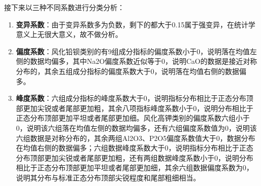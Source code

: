 \documentclass{article}
\begin{document}
	接下来以三种不同系数进行分类分析：
	
	\begin{enumerate}
		\item \textbf{变异系数}：由于变异系数多为负数，剩下的都大于0.15属于强变异，在统计学意义上无很大意义，故不做分析。
		\item \textbf{偏度系数}：风化铅钡类别的有9组成分指标的偏度系数小于0，说明落在均值左侧的数据均偏多，其中Na2O偏度系数近似等于0，说明CaO的数据是接近对称分布的，其余五组成分指标的偏度系数大于0，说明落在均值右侧的数据偏多。
		\item \textbf{峰度系数}：六组成分指标的峰度系数大于0，说明指标分布相比于正态分布顶部更加尖锐或者尾部更加粗，其余八项指标峰度系数小于0，说明分布相比于正态分布顶部更加平坦或者尾部更加细。风化高钾类别的偏度系数六组小于0，说明该六组落在均值左侧的数据均偏多，还有六组偏度系数值为0，说明该六组数据是对称分布的，其余两组Al2O3、P2O5偏度系数值大于0，数据分布在均值右侧的数据偏多；六组数据峰度系数大于0，说明指标分布相比于正态分布顶部更加尖锐或者尾部更加粗，还有两组数据峰度系数小于0，说明分布相比于正态分布顶部更加平坦或者尾部更加细，其余六组数据偏度系数为0，说明其分布与标准正态分布顶部尖锐程度和尾部粗细相当。
	\end{enumerate}
	
	
	
\end{document}

